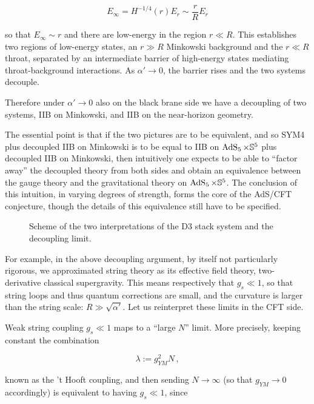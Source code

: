 \begin{equation}
	E_\infty = H^{-1/4}(r) E_r \sim \frac{r}{R} E_r
	\label{}
\end{equation}

so that $E_\infty \sim r$ and there are low-energy in the region $r \ll R$. This establishes two regions of low-energy states, an $r\gg R$ Minkowski background and the $r \ll R$ throat, separated by an intermediate barrier of high-energy states mediating throat-background interactions. As $\alpha' \rightarrow 0$, the barrier rises and the two systems decouple.

Therefore under $\alpha' \rightarrow 0$ also on the black brane side we have a decoupling of two systems, IIB on Minkowski, and IIB on the near-horizon geometry.

The essential point is that if the two pictures are to be equivalent, and so SYM4 plus decoupled IIB on Minkowski is to be equal to IIB on $\operatorname{AdS}_{5} \times \mathbb{S}^5$ plus decoupled IIB on Minkowski, then intuitively one expects to be able to ``factor away'' the decoupled theory from both sides and obtain an equivalence between the gauge theory and the gravitational theory on $\operatorname{AdS}_{5} \times \mathbb{S}^5$. The conclusion of this intuition, in varying degrees of strength, forms the core of the AdS/CFT conjecture, though the details of this equivalence still have to be specified.

\begin{figure}[H]
\centering
\def\svgwidth{400pt}
\captionsetup{width=0.8\textwidth}

\caption{Scheme of the two interpretations of the D3 stack system and the decoupling limit.}
\end{figure}

For example, in the above decoupling argument, by itself not particularly rigorous, we approximated string theory as its effective field theory, two-derivative classical supergravity. This means respectively that $g_s \ll 1$, so that string loops and thus quantum corrections are small, and the curvature is larger than the string scale: $R \gg \sqrt {\alpha'}$. Let us reinterpret these limits in the CFT side.

Weak string coupling $g_s \ll 1$ maps to a ``large $N$'' limit. More precisely, keeping constant the combination

\begin{equation}
	\lambda := g_{YM}^2 N\,,
\end{equation}

known as the 't Hooft coupling, and then sending $N \rightarrow \infty$ (so that $g_{YM} \rightarrow 0$ accordingly) is equivalent to having $g_s \ll 1$, since

